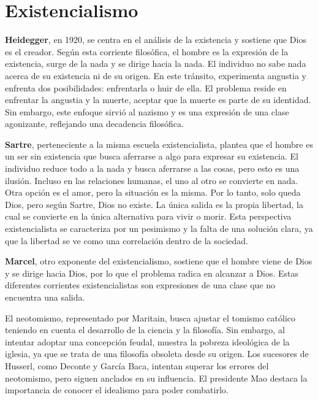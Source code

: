 \documentclass[
  jou,
  floatsintext,
  longtable,
  a4paper,
  nolmodern,
  notxfonts,
  notimes,
  12pt,
  colorlinks=true,linkcolor=blue,citecolor=blue,urlcolor=blue]{apa7}
\begin{document}
\section{Existencialismo}\label{existencialismo}

\textbf{Heidegger}, en 1920, se centra en el análisis de la existencia y
sostiene que Dios es el creador. Según esta corriente filosófica, el
hombre es la expresión de la existencia, surge de la nada y se dirige
hacia la nada. El individuo no sabe nada acerca de su existencia ni de
su origen. En este tránsito, experimenta angustia y enfrenta dos
posibilidades: enfrentarla o huir de ella. El problema reside en
enfrentar la angustia y la muerte, aceptar que la muerte es parte de su
identidad. Sin embargo, este enfoque sirvió al nazismo y es una
expresión de una clase agonizante, reflejando una decadencia filosófica.

\textbf{Sartre}, perteneciente a la misma escuela existencialista,
plantea que el hombre es un ser sin existencia que busca aferrarse a
algo para expresar su existencia. El individuo reduce todo a la nada y
busca aferrarse a las cosas, pero esto es una ilusión. Incluso en las
relaciones humanas, el uno al otro se convierte en nada. Otra opción es
el amor, pero la situación es la misma. Por lo tanto, solo queda Dios,
pero según Sartre, Dios no existe. La única salida es la propia
libertad, la cual se convierte en la única alternativa para vivir o
morir. Esta perspectiva existencialista se caracteriza por un pesimismo
y la falta de una solución clara, ya que la libertad se ve como una
correlación dentro de la sociedad.

\textbf{Marcel}, otro exponente del existencialismo, sostiene que el
hombre viene de Dios y se dirige hacia Dios, por lo que el problema
radica en alcanzar a Dios. Estas diferentes corrientes existencialistas
son expresiones de una clase que no encuentra una salida.

El neotomismo, representado por Maritain, busca ajustar el tomismo
católico teniendo en cuenta el desarrollo de la ciencia y la filosofía.
Sin embargo, al intentar adoptar una concepción feudal, muestra la
pobreza ideológica de la iglesia, ya que se trata de una filosofía
obsoleta desde su origen. Los sucesores de Husserl, como Deconte y
García Baca, intentan superar los errores del neotomismo, pero siguen
anclados en su influencia. El presidente Mao destaca la importancia de
conocer el idealismo para poder combatirlo.
\end{document}
